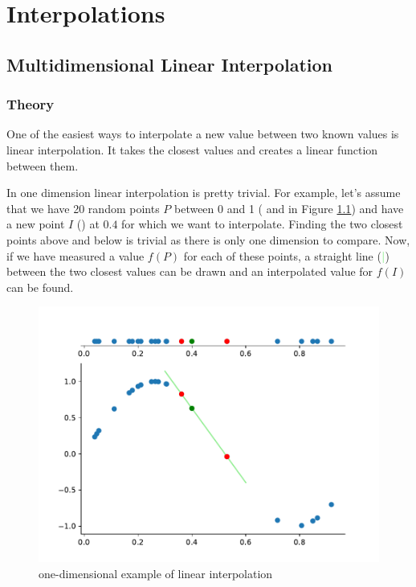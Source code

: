 \chapter{Interpolations}

\section{Multidimensional Linear Interpolation}

\subsection{Theory}

One of the easiest ways to interpolate a new value between two known values is linear interpolation. It takes the closest values and creates a linear function between them.

In one dimension linear interpolation is pretty trivial. For example, let's assume that we have 20 random points $P$ between 0 and 1 (\textcolor{Red}{\textbullet} and  \textcolor{Blue}{\textbullet} in Figure \ref{fig:one-dim-interpolation}) and have a new point $I$ (\textcolor{Green}{\textbullet}) at $0.4$ for which we want to interpolate. Finding the two closest points \textcolor{Red}{\textbullet} above and below is trivial as there is only one dimension to compare. Now, if we have measured a value $f(P)$ for each of these points, a straight line (\textcolor{LightGreen}{\textbf{|}}) between the two closest values can be drawn and an interpolated value for $f(I)$ can be found.

\begin{figure}[h] %
	\centering
	\includegraphics[width=0.8\linewidth]{images/vis1d.pdf}
	\caption{one-dimensional example of linear interpolation}
	\label{fig:one-dim-interpolation}
\end{figure}

